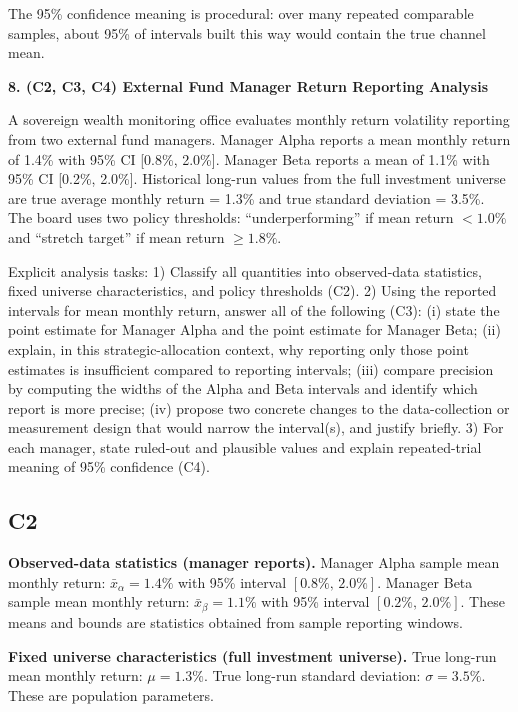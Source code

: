 \begin{ExamProblems}
		The 95\% confidence meaning is procedural: over many repeated comparable samples, about 95\% of intervals built this way would contain the true channel mean.
		
		\newpage
		\item
		\textbf{8. (C2, C3, C4) External Fund Manager Return Reporting Analysis}
		
		A sovereign wealth monitoring office evaluates monthly return volatility reporting from two external fund managers.
		Manager Alpha reports a mean monthly return of 1.4\% with 95\% CI [0.8\%, 2.0\%].
		Manager Beta reports a mean of 1.1\% with 95\% CI [0.2\%, 2.0\%].
		Historical long-run values from the full investment universe are true average monthly return = 1.3\% and true standard deviation = 3.5\%.
		The board uses two policy thresholds: ``underperforming'' if mean return $<1.0\%$ and ``stretch target'' if mean return $\ge 1.8\%$.
		
		Explicit analysis tasks:
		1) Classify all quantities into observed-data statistics, fixed universe characteristics, and policy thresholds (C2).
		2) Using the reported intervals for mean monthly return, answer all of the following (C3): (i) state the point estimate for Manager Alpha and the point estimate for Manager Beta; (ii) explain, in this strategic-allocation context, why reporting only those point estimates is insufficient compared to reporting intervals; (iii) compare precision by computing the widths of the Alpha and Beta intervals and identify which report is more precise; (iv) propose two concrete changes to the data-collection or measurement design that would narrow the interval(s), and justify briefly.
		3) For each manager, state ruled-out and plausible values and explain repeated-trial meaning of 95\% confidence (C4).
		
		\subsection*{C2}
		\textbf{Observed-data statistics (manager reports).}
		Manager Alpha sample mean monthly return: $\bar{x}_\alpha=1.4\%$ with 95\% interval $[0.8\%,\,2.0\%]$.
		Manager Beta sample mean monthly return: $\bar{x}_\beta=1.1\%$ with 95\% interval $[0.2\%,\,2.0\%]$.
		These means and bounds are statistics obtained from sample reporting windows.
		
		\textbf{Fixed universe characteristics (full investment universe).}
		True long-run mean monthly return: $\mu=1.3\%$.
		True long-run standard deviation: $\sigma=3.5\%$.
		These are population parameters.
		

\end{ExamProblems}

